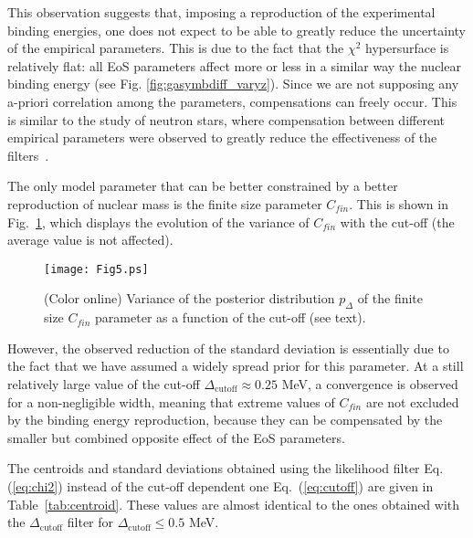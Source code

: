 \documentclass
[aps,prc,twocolumn,showpacs,showkeys,amsmath,floatfix,superscriptaddress]{revtex4}
\begin{document}
{{This observation suggests that, imposing a reproduction of the experimental binding energies, one does not expect to be able to greatly reduce the uncertainty of the empirical parameters. 
This is due to the fact that the $\chi^2$ hypersurface is relatively flat: all EoS parameters affect more or less
in a similar way the nuclear binding energy (see Fig. \ref{fig:gasymbdiff_varyz}). 
 Since we are not supposing any a-priori correlation among the parameters, compensations can freely occur. 
This is similar to the study of neutron stars, where compensation between different empirical parameters were observed to greatly reduce the effectiveness of the filters~\cite{Casali2}.
 

The only model parameter that can be better constrained by a better reproduction of nuclear mass is the finite size parameter $C_{fin}$. 
This is shown in Fig.~\ref{fig:cfin}, which displays the evolution of the variance of $C_{fin}$ with the cut-off (the average value is not affected).

\begin{figure}[htbp]
      \texttt{[image: Fig5.ps]}
\caption{(Color online) Variance of the posterior distribution $p_\Delta$ of the finite size $C_{fin}$ parameter as a function of the cut-off (see text). }
      \label{fig:cfin}
 \end{figure}

However, the observed reduction of the standard deviation is essentially due to the fact that we have assumed a widely spread prior for this parameter.  At a still relatively large value of the cut-off $\Delta_\mathrm{cutoff}\approx 0.25$ MeV, a convergence is observed for a non-negligible width, meaning that extreme values of $C_{fin}$ are not excluded by the binding energy reproduction, because they can be compensated by the smaller but combined opposite effect of the EoS parameters. 
 
The centroids and standard deviations obtained using the likelihood filter Eq.(\ref{eq:chi2}) instead of the cut-off dependent one Eq.~(\ref{eq:cutoff}) are given in Table~\ref{tab:centroid}. These values are almost identical to the ones obtained with the $\Delta_\mathrm{cutoff}$ filter 
for $\Delta_\mathrm{cutoff}\le 0.5$ MeV.  


}}
\end{document}
